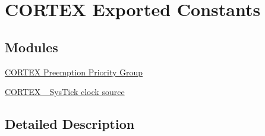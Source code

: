 \hypertarget{group___c_o_r_t_e_x___exported___constants}{}\section{C\+O\+R\+T\+EX Exported Constants}
\label{group___c_o_r_t_e_x___exported___constants}
\subsection*{Modules}
\begin{DoxyCompactItemize}
\item 
\hyperlink{group___c_o_r_t_e_x___preemption___priority___group}{C\+O\+R\+T\+E\+X Preemption Priority Group}
\item 
\hyperlink{group___c_o_r_t_e_x___sys_tick__clock__source}{C\+O\+R\+T\+E\+X \+\_\+\+Sys\+Tick clock source}
\end{DoxyCompactItemize}


\subsection{Detailed Description}
